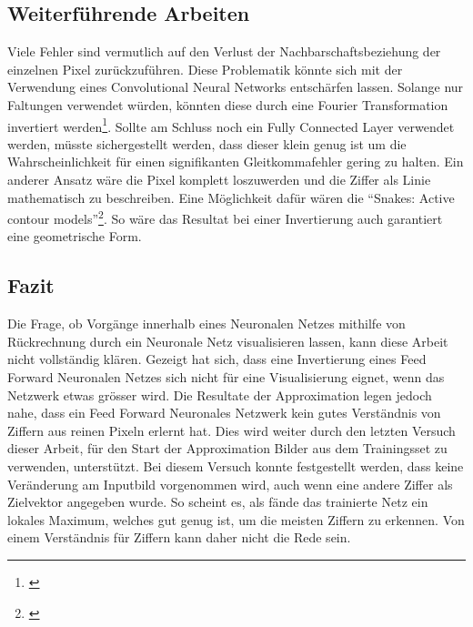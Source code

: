 \documentclass[Interploate_hadwritten_Digits.tex]{subfiles}
\begin{document}
	\subsection{Weiterführende Arbeiten}
	Viele Fehler sind vermutlich auf den Verlust der Nachbarschaftsbeziehung der einzelnen Pixel zurückzuführen. Diese Problematik könnte sich mit der Verwendung eines Convolutional Neural Networks entschärfen lassen. Solange nur Faltungen verwendet würden, könnten diese durch eine Fourier Transformation invertiert werden\footnote{\cite{weisstein-convolution_theorem}}. Sollte am Schluss noch ein Fully Connected Layer verwendet werden, müsste sichergestellt werden, dass dieser klein genug ist um die Wahrscheinlichkeit für einen signifikanten Gleitkommafehler gering zu halten.
	Ein anderer Ansatz wäre die Pixel komplett loszuwerden und die Ziffer als Linie mathematisch zu beschreiben. Eine Möglichkeit dafür wären die ``Snakes: Active contour models''\footnote{\cite{kass-snake}}. So wäre das Resultat bei einer Invertierung auch garantiert eine geometrische Form.
	
	\subsection{Fazit}
	Die Frage, ob Vorgänge innerhalb eines Neuronalen Netzes mithilfe von Rückrechnung durch ein Neuronale Netz visualisieren lassen, kann diese Arbeit nicht vollständig klären. Gezeigt hat sich, dass eine Invertierung eines Feed Forward Neuronalen Netzes sich nicht für eine Visualisierung eignet, wenn das Netzwerk etwas grösser wird. Die Resultate der Approximation legen jedoch nahe, dass ein Feed Forward Neuronales Netzwerk kein gutes Verständnis von Ziffern aus reinen Pixeln erlernt hat. Dies wird weiter durch den letzten Versuch dieser Arbeit, für den Start der Approximation Bilder aus dem Trainingsset zu verwenden, unterstützt. Bei diesem Versuch konnte festgestellt werden, dass keine Veränderung am Inputbild vorgenommen wird, auch wenn eine andere Ziffer als Zielvektor angegeben wurde. So scheint es, als fände das trainierte Netz ein lokales Maximum, welches gut genug ist, um die meisten Ziffern zu erkennen. Von einem Verständnis für Ziffern kann daher nicht die Rede sein.
	
\end{document}
